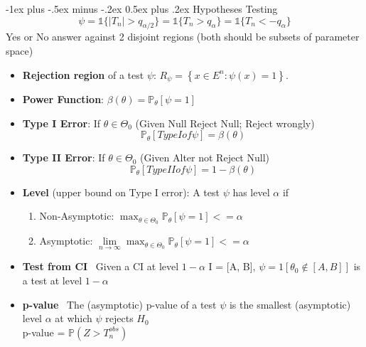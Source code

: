 \documentclass[a4paper, 10pt,landscape]{article}
\makeatletter
\renewcommand{\section}{\@startsection{section}{1}{0mm}%
                                {-1ex plus -.5ex minus -.2ex}%
                                {0.5ex plus .2ex}%
                                {\normalfont\large\bfseries}}
\makeatother
\begin{document}
\begin{multicols*}{3}
\section{Hypotheses Testing}
$$\psi=\mathds{1}\{|T_n|>q_{\alpha / 2}\}=\mathds{1}\{T_n >q_{\alpha}\}=\mathds{1}\{T_n <-q_{\alpha}\}$$ Yes or No answer against 2 disjoint regions (both should be subsets of parameter space)
	\begin{itemize}
		\item {\bf Rejection region} of a test $\psi$: $R_\psi=\left\{x\in E^n:\psi(x)=1\right\}.$
		\item {\bf Power Function}: $\beta(\theta) = \mathbb{P}_{\theta}[\psi = 1]$ 
		\item {\bf Type I Error}: If $\theta \in \Theta_0$ (Given Null Reject Null; Reject wrongly)
			$$ \mathbb{P}_{\theta}[Type I of \psi] = \beta(\theta)$$
		\item{\bf Type II Error}: If $\theta \in \Theta_0$ (Given Alter not Reject Null)
			$$\mathbb{P}_{\theta}[Type II of \psi] = 1 - \beta(\theta)$$
		\item{\bf Level} (upper bound on Type I error): A test $\psi$ has level $\alpha$ if 
			\begin{enumerate}
				\item Non-Asymptotic: $\max_{\theta \in \Theta_0} \mathbb{P}_{\theta}[\psi = 1] <= \alpha$
				\item Asymptotic:  $\lim\limits_{n\rightarrow\infty} \max_{\theta \in \Theta_0} \mathbb{P}_{\theta}[\psi = 1] <= \alpha$
			\end{enumerate}
		\item{\bf Test from CI}~
			 Given a CI at level $1-\alpha$ I = [A, B], $\psi = 1 [\theta_0 \notin [A, B]]$ is a test at level $1-\alpha$

		\item {\bf p-value}~
			The (asymptotic) p-value of a test $\psi$ is the smallest (asymptotic) level $\alpha$ at which $\psi$ rejects $H_0$ \\
			p-value = $\mathbb{P}(Z > T_n^{obs})$	
	\end{itemize}


\end{multicols*}
\end{document}
